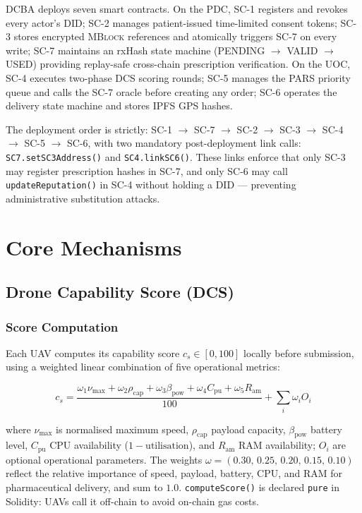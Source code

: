 \documentclass[sigplan,screen]{acmart}
\newcommand{\dcba}{\textsc{DCBA}\xspace}
\newcommand{\pdc}{PDC\xspace}
\newcommand{\uoc}{UOC\xspace}
\newcommand{\pars}{\textsc{PARS}\xspace}
\newcommand{\mblock}{\textsc{MBlock}\xspace}
\begin{document}
\dcba deploys seven smart contracts.
On the \pdc, SC-1 registers and revokes every actor's DID; SC-2 manages
patient-issued time-limited consent tokens; SC-3 stores encrypted \mblock
references and atomically triggers SC-7 on every write; SC-7 maintains an
rxHash state machine (PENDING $\!\to\!$ VALID $\!\to\!$ USED) providing
replay-safe cross-chain prescription verification.
On the \uoc, SC-4 executes two-phase DCS scoring rounds; SC-5 manages the
\pars priority queue and calls the SC-7 oracle before creating any order;
SC-6 operates the delivery state machine and stores IPFS GPS hashes.

The deployment order is strictly: SC-1 $\to$ SC-7 $\to$ SC-2 $\to$ SC-3 $\to$
SC-4 $\to$ SC-5 $\to$ SC-6, with two mandatory post-deployment link calls:
\texttt{SC7.setSC3Address()} and \texttt{SC4.linkSC6()}.
These links enforce that only SC-3 may register prescription hashes in SC-7,
and only SC-6 may call \texttt{updateReputation()} in SC-4 without holding a
DID — preventing administrative substitution attacks.

\section{Core Mechanisms}\label{sec:mechanisms}

\subsection{Drone Capability Score (DCS)}
\label{subsec:dcs}

\subsubsection{Score Computation}
Each UAV computes its capability score $c_s \in [0,100]$ locally before
submission, using a weighted linear combination of five operational metrics:

\begin{equation}
  c_s = \frac{\omega_1 \nu_{\max} + \omega_2 \rho_{\text{cap}} +
             \omega_3 \beta_{\text{pow}} + \omega_4 C_{\text{pu}} +
             \omega_5 R_{\text{am}}}
            {100} + \sum_i \omega_i O_i
  \label{eq:dcs}
\end{equation}

\noindent where $\nu_{\max}$ is normalised maximum speed, $\rho_{\text{cap}}$
payload capacity, $\beta_{\text{pow}}$ battery level, $C_{\text{pu}}$ CPU
availability ($1 - \text{utilisation}$), and $R_{\text{am}}$ RAM availability;
$O_i$ are optional operational parameters.
The weights $\omega = (0.30,\, 0.25,\, 0.20,\, 0.15,\, 0.10)$ reflect
the relative importance of speed, payload, battery, CPU, and RAM for
pharmaceutical delivery, and sum to $1.0$.
\texttt{computeScore()} is declared \texttt{pure} in Solidity: UAVs call it
off-chain to avoid on-chain gas costs.
\end{document}
